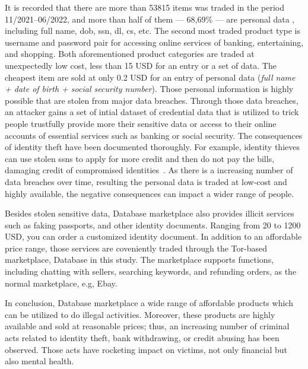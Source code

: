It is recorded that there are more than 53815 items was traded in the period
11/2021--06/2022, and more than half of them --- 68,69\% --- are personal data
, including full name, \acrlong{dob}, \acrlong{ssn}, \acrlong{dl}, \acrlong{cs},
etc. The second
most traded product type is username and password pair for accessing online
services of banking, entertaining, and shopping. Both aforementioned product
categories are traded at unexpectedly low cost, less than 15 USD for an entry or
a set of data. The cheapest item are sold at only 0.2 USD for an entry of personal
data (\emph{full name + date of birth + social security number}). Those personal
information is highly possible that are stolen from major data breaches. Through
those data breaches, an attacker gains a set of intial dataset of credential data
that is utilized to trick people trustfully provide more their sensitive data or
access to their online accounts of essential services such as banking or social
security. The consequences of identity theft have been documented thoroughly.
For example, identity thieves can use stolen \acrshort{ssn}s to apply for more
credit and then do not pay the bills, damaging credit of compromised identities~\cite{web:identity_theft}.
As there is a increasing number of data breaches over time, resulting the personal
data is traded at low-cost and highly available, the negative consequences can impact
a wider range of people.

Besides stolen sensitive data, Database marketplace also provides illicit services
such as faking passports, and other identity documents. Ranging from 20 to 1200 USD,
you can order a customized identity document. In addition to an affordable price range,
those services are coveniently traded through the Tor-based marketplace, Database in
this study. The marketplace supports functions, including chatting with sellers, 
searching keywords, and refunding orders, as the normal marketplace, e.g, Ebay.

In conclusion, Database marketplace a wide range of affordable products which
can be utilized to do illegal activities. Moreover, these products are highly
available and sold at reasonable prices; thus, an increasing number of criminal
acts related to identity theft, bank withdrawing, or credit abusing has been
observed. Those acts have rocketing impact on victims, not only financial but
also mental health.
